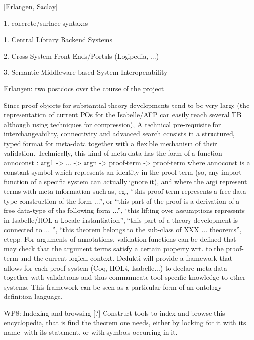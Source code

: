 [Erlangen, Saclay]


1. concrete/surface syntaxes 

1. Central Library Backend Systems 

2. Cross-System Front-Ends/Portals (Logipedia, ...)

3. Semantic Middleware-based System Interoperability 

Erlangen: two postdocs over the course of the project

Since proof-objects for substantial theory developments tend to be
very large (the representation of current POs for the Isabelle/AFP can
easily reach several TB although using techniques for compression), A
technical pre-requisite for interchangeability, connectivity and
advanced search consists in a structured, typed format for meta-data
together with a flexible mechanism of their validation. Technically,
this kind of meta-data has the form of a function annoconst : arg1 ->
... -> argn -> proof-term -> proof-term where annoconst is a constant
symbol which represents an identity in the proof-term (so, any import
function of a specific system can actually ignore it), and where the
argi represent terms with meta-information such as, eg., “this
proof-term represents a free data-type construction of the form ...”,
or “this part of the proof is a derivation of a free data-type of the
following form ...”, “this lifting over assumptions represents in
Isabelle/HOL a Locale-instantiation”, “this part of a theory
development is connected to ... ”, “this theorem belongs to the
sub-class of XXX ... theorems”, etcpp. For arguments of annotations,
validation-functions can be defined that may check that the argument
terms satisfy a certain property wrt. to the proof-term and the
current logical context. Dedukti will provide a framework that allows
for each proof-system (Coq, HOL4, Isabelle...) to declare meta-data
together with validations and thus communicate tool-specific knowledge
to other systems. This framework can be seen as a particular form of
an ontology definition language.
 
WP8: Indexing and browsing [?]  Construct tools to index and browse
this encyclopedia, that is find the theorem one needs, either by
looking for it with its name, with its statement, or with symbols
occurring in it.
